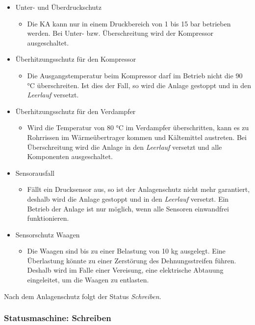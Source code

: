 \begin{itemize}
\item Unter- und Überdruckschutz
	\begin{itemize}
		\item Die KA kann nur in einem Druckbereich von 1 bis 15 		bar betrieben werden. Bei Unter- bzw. Überschreitung 				wird der Kompressor ausgeschaltet. 
	\end{itemize}
\item Überhitzungsschutz für den Kompressor
	\begin{itemize}
		\item Die Ausgangstemperatur beim Kompressor darf im 						Betrieb nicht die 90 °C überschreiten. Ist dies 					der Fall, so wird die Anlage gestoppt und in den 				\textit{Leerlauf} versetzt. 
	\end{itemize}
\item Überhitzungsschutz für den Verdampfer
	\begin{itemize}
		\item Wird die Temperatur von 80 °C  im Verdampfer 						überschritten, kann es zu Rohrrissen im 							Wärmeübertrager kommen und Kältemittel austreten. 					Bei Überschreitung wird die Anlage in den 							\textit{Leerlauf} versetzt und alle Komponenten 					ausgeschaltet. 
	\end{itemize}
\item Sensorausfall
	\begin{itemize}
		\item Fällt ein Drucksensor aus, so ist der 						Anlagenschutz nicht mehr garantiert, deshalb wird die 				Anlage gestoppt und in den \textit{Leerlauf} versetzt. 				Ein Betrieb der Anlage ist nur möglich, wenn alle 					Sensoren einwandfrei funktionieren.  
	\end{itemize}
\item Sensorschutz Waagen
	\begin{itemize}
		\item Die Waagen sind bis zu einer Belastung von 10 kg 				ausgelegt. Eine Überlastung könnte zu einer Zerstörung 				des Dehnungsstreifen führen. Deshalb wird im Falle einer 		Vereisung, eine elektrische Abtauung eingeleitet, um die 		Waagen zu entlasten. 
	\end{itemize}
\end{itemize} 

Nach dem Anlagenschutz folgt der Status \textit{Schreiben}.


\subsubsection*{Statusmaschine: Schreiben}

